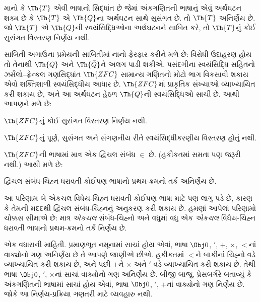 \begin{thm}
  માનો કે $\Th{T}$ એવી
  ભાષાનો સિદ્ધાંત છે જેમાં
  અંકગણિતની ભાષાનું એવું
  અર્થઘટન શક્ય છે કે
  $\Th{T}$ એ $\Th{Q}$ના
  અર્થઘટન સાથે સુસંગત છે.
  તો $\Th{T}$ અનિર્ણેય છે.
  જો $\Th{T}$ એ
  $\Th{Q}$ની સ્વયંસિદ્ધિઓના
  અર્થઘટનને સાબિત કરે,
  તો $\Th{T}$નું કોઈ
  સુસંગત વિસ્તરણ નિર્ણેય
  નથી.
\end{thm}

સાબિતી અગાઉના પ્રમેયની
સાબિતીમાં નાનો ફેરફાર
કરીને મળે છે: વિરોધી
ઉદાહરણ હોય તો તેનાથી
$\Th{Q}$ અને
$\Th{\bar Q}$ને અલગ
પાડી શકીએ. પસંદગીના
સ્વયંસિદ્ધિ સહિતનો
ઝર્મેલો--ફ્રેન્કલ ગણસિદ્ધાંત
$\Th{ZFC}$ સામાન્ય ગણિતનો
મોટો ભાગ વિકસાવી શકાય
એવો શક્તિશાળી
સ્વયંસિદ્ધીય આધાર છે.
$\Th{ZFC}$માં પ્રાકૃતિક
સંખ્યાઓ વ્યાખ્યાયિત કરી
શકાય છે, અને આ અર્થઘટન
હેઠળ $\Th{Q}$ની
સ્વયંસિદ્ધિઓ સાચી છે.
આથી આપણને મળે છે:

\begin{cor}
$\Th{ZFC}$નું કોઈ
સુસંગત વિસ્તરણ નિર્ણેય નથી.
\end{cor}

\begin{cor}
$\Th{ZFC}$નું પૂર્ણ,
સુસંગત અને સંગણનીય
રીતે સ્વયંસિદ્ધીકરણીય
વિસ્તરણ હોતું નથી.
\end{cor}

$\Th{ZFC}$ની ભાષામાં
માત્ર એક દ્વિચલ સંબંધ
$\in$ છે. (હકીકતમાં
સમતા પણ જરૂરી નથી.)
આથી મળે છે:

\begin{cor}
દ્વિચલ સંબંધ-ચિહ્ન
ધરાવતી કોઈપણ ભાષાનો
પ્રથમ-ક્રમનો તર્ક
અનિર્ણેય છે.
\end{cor}

આ પરિણામ બે એકચલ
વિધેય-ચિહ્ન ધરાવતી કોઈપણ
ભાષા માટે પણ લાગુ પડે છે,
કારણ કે તેમની મદદથી
દ્વિચલ સંબંધ-ચિહ્નનું
અનુકરણ કરી શકાય છે.
હમણાં આપેલાં પરિણામો
ચોક્કસ સીમાએ છે: માત્ર
\emph{એકચલ} સંબંધ-ચિહ્નો
અને વધુમાં વધુ એક
\emph{એકચલ} વિધેય-ચિહ્ન
ધરાવતી ભાષાનો પ્રથમ-ક્રમનો
તર્ક નિર્ણેય છે.

એક વધારાની માહિતી.
પ્રમાણભૂત નમૂનામાં સાચાં
હોય એવાં, ભાષા
$\Obj 0$, $'$, $+$,
$\times$, $<$નાં વાક્યોનો
ગણ અનિર્ણેય છે તે આપણે
જાણીએ છીએ. હકીકતમાં
$<$ને બાકીનાં ચિહ્નો
વડે વ્યાખ્યાયિત કરી
શકાય છે, અને પછી
$+$ને $\times$ અને $'$
વડે વ્યાખ્યાયિત કરી
શકાય છે. તેથી ભાષા
$\Obj 0$, $'$, $\times$નાં
સાચાં વાક્યોનો ગણ
અનિર્ણેય છે. બીજી બાજુ,
પ્રેસબર્ગરે બતાવ્યું કે
અંકગણિતની ભાષામાં
સાચાં હોય એવાં, ભાષા
$\Obj 0$, $'$, $+$નાં
વાક્યોનો ગણ નિર્ણેય છે.
જોકે આ નિર્ણય-પ્રક્રિયા
ગણતરી માટે વ્યવહારુ નથી.
\endgroup


